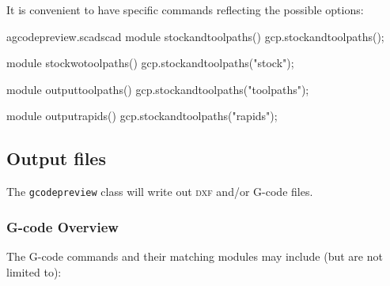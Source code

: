 \documentclass{ltxdoc}
\begin{document}
It is convenient to have specific commands reflecting the possible options:

\lstset{firstnumber=\thegcpscad}
\begin{writecode}{a}{gcodepreview.scad}{scad}
module stockandtoolpaths(){
    gcp.stockandtoolpaths();
}

module stockwotoolpaths(){
    gcp.stockandtoolpaths("stock");
}

module outputtoolpaths(){
    gcp.stockandtoolpaths("toolpaths");
}

module outputrapids(){
    gcp.stockandtoolpaths("rapids");
}

\end{writecode}
\addtocounter{gcpscad}{16}

\subsection{Output files}

The \verb|gcodepreview| class will write out \textsc{dxf} and/or G-code files.

\subsubsection{G-code Overview}
 
The G-code commands and their matching modules may include (but are not limited to):

\bigskip
\end{document}
